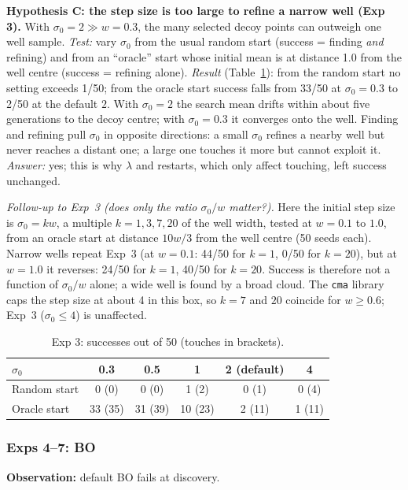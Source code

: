 \documentclass[10pt,a4paper]{article}
\begin{document}
\textbf{Hypothesis C: the step size is too large to refine a narrow well (Exp 3).} With $\sigma_0=2\gg w=0.3$, the many selected decoy points can outweigh one well sample. \emph{Test:} vary $\sigma_0$ from the usual random start (success = finding \emph{and} refining) and from an ``oracle'' start whose initial mean is at distance 1.0 from the well centre (success = refining alone). \emph{Result} (Table~\ref{tab:sig}): from the random start no setting exceeds 1/50; from the oracle start success falls from 33/50 at $\sigma_0=0.3$ to 2/50 at the default $2$. With $\sigma_0=2$ the search mean drifts within about five generations to the decoy centre; with $\sigma_0=0.3$ it converges onto the well. Finding and refining pull $\sigma_0$ in opposite directions: a small $\sigma_0$ refines a nearby well but never reaches a distant one; a large one touches it more but cannot exploit it. \emph{Answer:} yes; this is why $\lambda$ and restarts, which only affect touching, left success unchanged.

\emph{Follow-up to Exp~3 (does only the ratio $\sigma_0/w$ matter?).} Here the initial step size is $\sigma_0=kw$, a multiple $k=1,3,7,20$ of the well width, tested at $w=0.1$ to $1.0$, from an oracle start at distance $10w/3$ from the well centre (50 seeds each). Narrow wells repeat Exp~3 (at $w=0.1$: 44/50 for $k=1$, 0/50 for $k=20$), but at $w=1.0$ it reverses: 24/50 for $k=1$, 40/50 for $k=20$. Success is therefore not a function of $\sigma_0/w$ alone; a wide well is found by a broad cloud. The \texttt{cma} library caps the step size at about 4 in this box, so $k=7$ and $20$ coincide for $w\ge0.6$; Exp~3 ($\sigma_0\le4$) is unaffected.

\begin{table}[!ht]
\centering\footnotesize
\caption{Exp 3: successes out of 50 (touches in brackets).}\label{tab:sig}
\begin{tabular}{@{}lccccc@{}}
\toprule
$\sigma_0$ & 0.3 & 0.5 & 1 & 2 (default) & 4 \\
\midrule
Random start & 0 (0) & 0 (0) & 1 (2) & 0 (1) & 0 (4) \\
Oracle start & 33 (35) & 31 (39) & 10 (23) & 2 (11) & 1 (11) \\
\bottomrule
\end{tabular}
\end{table}

\subsubsection{Exps 4--7: BO}
\textbf{Observation:} default BO fails at discovery.
\end{document}
